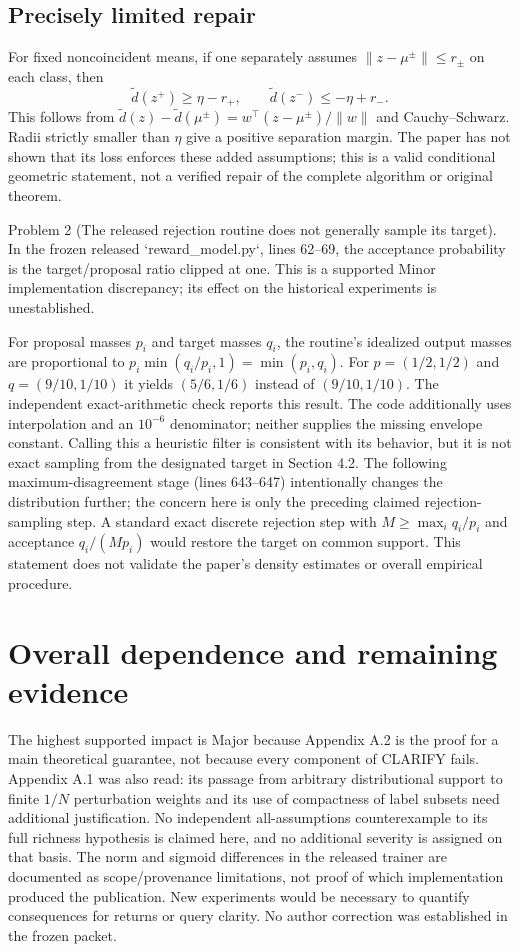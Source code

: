 \documentclass[10pt]{article}
\begin{document}
\subsection*{Precisely limited repair}
For fixed noncoincident means, if one separately assumes \(\|z-\mu^\pm\|\le r_\pm\) on each class, then \[\widetilde d(z^+)\ge\eta-r_+,\qquad \widetilde d(z^-)\le-\eta+r_-.\] This follows from \(\widetilde d(z)-\widetilde d(\mu^\pm)=w^\top(z-\mu^\pm)/\|w\|\) and Cauchy–Schwarz. Radii strictly smaller than \(\eta\) give a positive separation margin. The paper has not shown that its loss enforces these added assumptions; this is a valid conditional geometric statement, not a verified repair of the complete algorithm or original theorem.\par
Problem 2 (The released rejection routine does not generally sample its target).  In the frozen released `reward\_model.py`, lines 62–69, the acceptance probability is the target/proposal ratio clipped at one. This is a supported Minor implementation discrepancy; its effect on the historical experiments is unestablished.\par
For proposal masses \(p_i\) and target masses \(q_i\), the routine’s idealized output masses are proportional to \(p_i\min(q_i/p_i,1)=\min(p_i,q_i)\). For \(p=(1/2,1/2)\) and \(q=(9/10,1/10)\) it yields \((5/6,1/6)\) instead of \((9/10,1/10)\). The independent exact-arithmetic check reports this result. The code additionally uses interpolation and an \(10^{-6}\) denominator; neither supplies the missing envelope constant. Calling this a heuristic filter is consistent with its behavior, but it is not exact sampling from the designated target in Section 4.2. The following maximum-disagreement stage (lines 643–647) intentionally changes the distribution further; the concern here is only the preceding claimed rejection-sampling step. A standard exact discrete rejection step with \(M\ge\max_i q_i/p_i\) and acceptance \(q_i/(Mp_i)\) would restore the target on common support. This statement does not validate the paper’s density estimates or overall empirical procedure.\par
\section*{Overall dependence and remaining evidence}
The highest supported impact is Major because Appendix A.2 is the proof for a main theoretical guarantee, not because every component of CLARIFY fails. Appendix A.1 was also read: its passage from arbitrary distributional support to finite \(1/N\) perturbation weights and its use of compactness of label subsets need additional justification. No independent all-assumptions counterexample to its full richness hypothesis is claimed here, and no additional severity is assigned on that basis. The norm and sigmoid differences in the released trainer are documented as scope/provenance limitations, not proof of which implementation produced the publication. New experiments would be necessary to quantify consequences for returns or query clarity. No author correction was established in the frozen packet.\par
\end{document}
